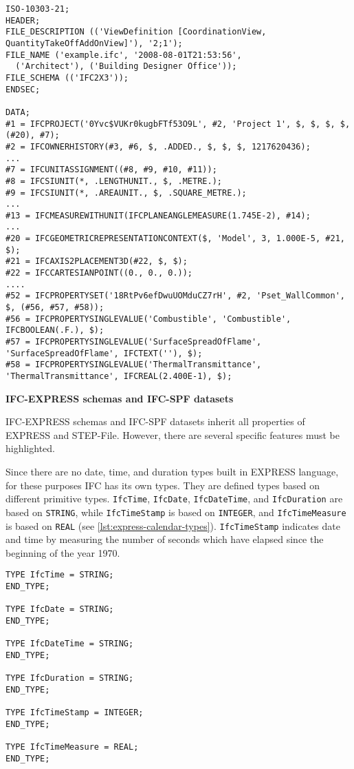 \begin{lstlisting}[caption={Fragment of a STEP-File},label=lst:step-file]
ISO-10303-21;
HEADER;
FILE_DESCRIPTION (('ViewDefinition [CoordinationView, QuantityTakeOffAddOnView]'), '2;1');
FILE_NAME ('example.ifc', '2008-08-01T21:53:56', 
  ('Architect'), ('Building Designer Office'));
FILE_SCHEMA (('IFC2X3'));
ENDSEC;

DATA;
#1 = IFCPROJECT('0Yvc$VUKr0kugbFTf53O9L', #2, 'Project 1', $, $, $, $, (#20), #7);
#2 = IFCOWNERHISTORY(#3, #6, $, .ADDED., $, $, $, 1217620436);
...
#7 = IFCUNITASSIGNMENT((#8, #9, #10, #11));
#8 = IFCSIUNIT(*, .LENGTHUNIT., $, .METRE.);
#9 = IFCSIUNIT(*, .AREAUNIT., $, .SQUARE_METRE.);
...
#13 = IFCMEASUREWITHUNIT(IFCPLANEANGLEMEASURE(1.745E-2), #14);
...
#20 = IFCGEOMETRICREPRESENTATIONCONTEXT($, 'Model', 3, 1.000E-5, #21, $);
#21 = IFCAXIS2PLACEMENT3D(#22, $, $);
#22 = IFCCARTESIANPOINT((0., 0., 0.));
....
#52 = IFCPROPERTYSET('18RtPv6efDwuUOMduCZ7rH', #2, 'Pset_WallCommon', $, (#56, #57, #58));
#56 = IFCPROPERTYSINGLEVALUE('Combustible', 'Combustible', IFCBOOLEAN(.F.), $);
#57 = IFCPROPERTYSINGLEVALUE('SurfaceSpreadOfFlame', 'SurfaceSpreadOfFlame', IFCTEXT(''), $);
#58 = IFCPROPERTYSINGLEVALUE('ThermalTransmittance', 'ThermalTransmittance', IFCREAL(2.400E-1), $);
\end{lstlisting}


\noindent\textbf{IFC-EXPRESS schemas and IFC-SPF datasets}

IFC-EXPRESS schemas and IFC-SPF datasets inherit all properties of EXPRESS and STEP-File.
However, there are several specific features must be highlighted.

Since there are no date, time, and duration types built in EXPRESS language, for these purposes IFC has its own types.
They are defined types based on different primitive types.
\texttt{IfcTime}, \texttt{IfcDate}, \texttt{IfcDateTime}, and \texttt{IfcDuration} are based on \texttt{STRING}, while \texttt{IfcTimeStamp} is based on \texttt{INTEGER}, and \texttt{IfcTimeMeasure} is based on \texttt{REAL} (see \autoref{lst:express-calendar-types}).
\texttt{IfcTimeStamp} indicates date and time by measuring the number of seconds which have elapsed since the beginning of the year 1970.


\begin{lstlisting}[caption={Examples of date, time and duration types},label=lst:express-calendar-types]
TYPE IfcTime = STRING;
END_TYPE;

TYPE IfcDate = STRING;
END_TYPE;

TYPE IfcDateTime = STRING;
END_TYPE;

TYPE IfcDuration = STRING;
END_TYPE;

TYPE IfcTimeStamp = INTEGER;
END_TYPE;

TYPE IfcTimeMeasure = REAL;
END_TYPE;
\end{lstlisting}



